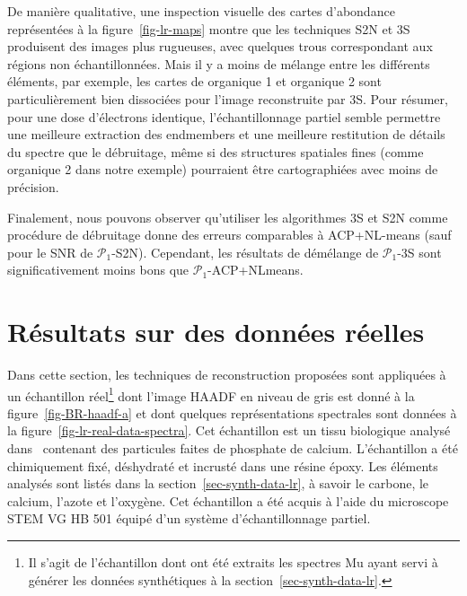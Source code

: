 De manière qualitative, une inspection visuelle des cartes d'abondance représentées à la figure~\ref{fig-lr-maps} montre que les techniques S2N et 3S produisent des images plus rugueuses, avec quelques trous correspondant aux régions non échantillonnées. Mais il y a moins de mélange entre les différents éléments, par exemple, les cartes de organique 1 et organique 2 sont particulièrement bien dissociées pour l'image reconstruite par 3S. Pour résumer, pour une dose d'électrons identique, l'échantillonnage partiel semble permettre une meilleure extraction des endmembers et une meilleure restitution de détails du spectre que le débruitage, même si des structures spatiales fines (comme organique 2 dans notre exemple) pourraient être cartographiées avec moins de précision.

Finalement, nous pouvons observer qu'utiliser les algorithmes 3S et S2N comme procédure de débruitage donne des erreurs comparables à ACP+NL-means (sauf pour le SNR de $\mathcal{P}_1$-S2N). Cependant, les résultats de démélange de $\mathcal{P}_1$-3S sont significativement moins bons que $\mathcal{P}_1$-ACP+NLmeans. 



%
\section{Résultats sur des données réelles}\label{sec-3s-real-data}

Dans cette section, les techniques de reconstruction proposées sont appliquées à un échantillon réel\footnote{Il s'agit de l'échantillon dont ont été extraits les spectres \gls{Mu} ayant servi à générer les données synthétiques à la section~\ref{sec-synth-data-lr}.} dont l'image HAADF en niveau de gris est donné à la figure~\ref{fig-BR-haadf-a} et dont quelques représentations spectrales sont données à la figure~\ref{fig-lr-real-data-spectra}. 
%
Cet échantillon est un tissu biologique analysé dans~\cite{gay2020nanoscale} contenant des particules faites de phosphate de calcium. L'échantillon a été chimiquement fixé, déshydraté et incrusté dans une résine époxy. Les éléments analysés sont listés dans la section~\ref{sec-synth-data-lr}, à savoir le carbone, le calcium, l'azote et l'oxygène. Cet échantillon a été acquis à l'aide du microscope STEM VG HB 501 équipé d'un système d'échantillonnage partiel.

